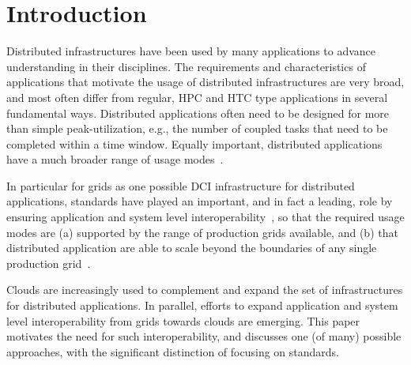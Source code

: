 \documentclass[10pt,conference,final,letterpaper,twoside,twocolumn,]{IEEEtran}
\begin{document}


\section{Introduction}


\label{sec:intro}
 



 Distributed infrastructures have been used by many applications to
 advance understanding in their disciplines.  The requirements and
 characteristics of applications that motivate the usage of
 distributed infrastructures are very broad, and most often differ
 from regular, HPC and HTC type applications in several fundamental
 ways.  Distributed applications often need to be designed for more
 than simple peak-utilization, e.g., the number of coupled tasks that
 need to be completed within a time window.  Equally important,
 distributed applications have a much broader range of usage
 modes~\cite{dpa_surveypaper}.

 In particular for grids as one possible DCI infrastructure for
 distributed applications, standards have played an important, and in
 fact a leading, role by ensuring application and system level
 interoperability~\cite{gin,saga_gin}, so that the required usage
 modes are (a) supported by the range of production grids available,
 and (b) that distributed application are able to scale beyond the
 boundaries of any single production grid~\cite{grid_scale_out}.

 Clouds are increasingly used to complement and expand the set of
 infrastructures for distributed applications.  In parallel, efforts
 to expand application and system level interoperability from grids
 towards clouds are emerging.  This paper motivates the need for such
 interoperability, and discusses one (of many) possible approaches,
 with the significant distinction of focusing on standards.
\end{document}
